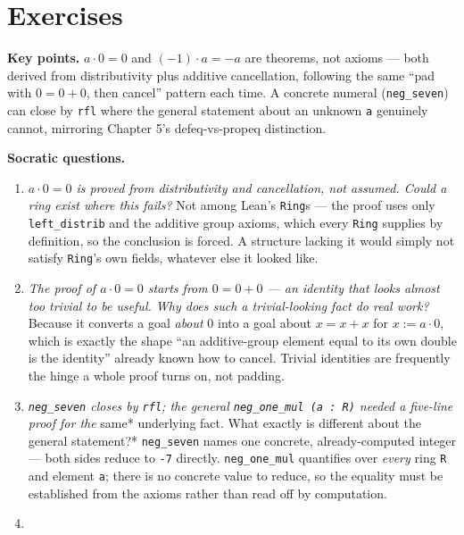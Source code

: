 \section{Exercises}\label{sec:09-ring-theorems:04-exercises:1}

\textbf{Key points.} \(a\cdot 0=0\) and \((-1)\cdot a=-a\) are theorems, not axioms --- both derived from distributivity plus additive cancellation, following the same ``pad with \(0=0+0\), then cancel'' pattern each time. A concrete numeral (\texttt{neg\_\allowbreak{}seven}) can close by \texttt{rfl} where the general statement about an unknown \texttt{a} genuinely cannot, mirroring Chapter 5's defeq-vs-propeq distinction.

\textbf{Socratic questions.}

\begin{enumerate}
\def\labelenumi{\arabic{enumi}.}
\item
  \emph{\(a \cdot 0 = 0\) is proved from distributivity and cancellation, not assumed. Could a ring exist where this fails?} Not among Lean's \texttt{Ring}s --- the proof uses only \texttt{left\_\allowbreak{}distrib} and the additive group axioms, which every \texttt{Ring} supplies by definition, so the conclusion is forced. A structure lacking it would simply not satisfy \texttt{Ring}'s own fields, whatever else it looked like.
\item
  \emph{The proof of \(a \cdot 0 = 0\) starts from \(0 = 0 + 0\) --- an identity that looks almost too trivial to be useful. Why does such a trivial-looking fact do real work?} Because it converts a goal \emph{about} \(0\) into a goal about \(x = x + x\) for \(x := a \cdot 0\), which is exactly the shape ``an additive-group element equal to its own double is the identity'' already known how to cancel. Trivial identities are frequently the hinge a whole proof turns on, not padding.
\item
  \emph{\texttt{neg\_\allowbreak{}seven} closes by \texttt{rfl}; the general \texttt{neg\_\allowbreak{}one\_\allowbreak{}mul (a : R)} needed a five-line proof for the }same* underlying fact. What exactly is different about the general statement?* \texttt{neg\_\allowbreak{}seven} names one concrete, already-computed integer --- both sides reduce to \texttt{-\allowbreak{}7} directly. \texttt{neg\_\allowbreak{}one\_\allowbreak{}mul} quantifies over \emph{every} ring \texttt{R} and element \texttt{a}; there is no concrete value to reduce, so the equality must be established from the axioms rather than read off by computation.
\item

\end{enumerate}
